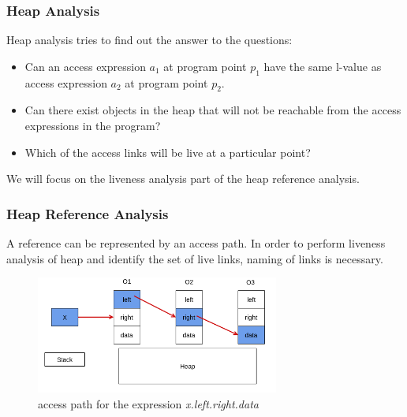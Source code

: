 \documentclass{beamer}
\begin{document}
  
  
  
  \begin{frame}
  \frametitle{Heap Analysis}
	Heap analysis tries to find out the answer to the questions: 
	\begin{itemize}
		\item Can an access expression $a_1$ at program point $p_1$ have the same l-value as access expression $a_2$ at program  point $p_2$.
		\item Can there exist objects in the heap that will not be reachable from the access expressions in the program?
		\item Which of the access links will be live at a particular point?
	\end{itemize}
	We will focus on the liveness analysis part of the heap reference analysis.
	\end{frame}

\begin{frame}
\frametitle{Heap Reference Analysis}

A reference can be represented by an access path. In order to perform liveness analysis of heap and identify the set of live links, naming of links is necessary.


	\begin{figure}[here]
		\begin{center}
			\includegraphics[width=8cm]{Figures/hra_access_path.png}
		\end{center}
		\caption{access path for the expression \emph{x.left.right.data}}
		\label{fig:accpath}
	\end{figure}

\end{frame}
\end{document}
